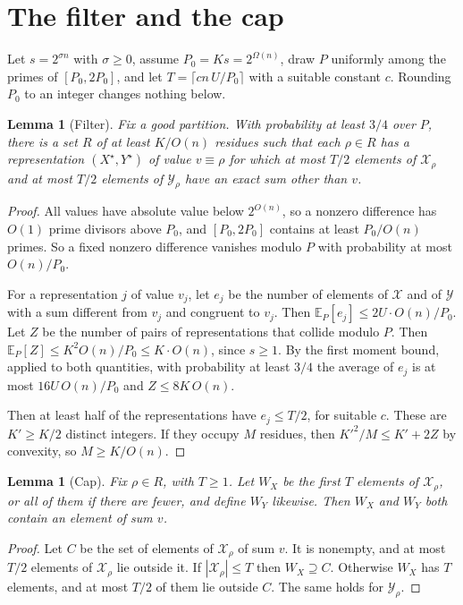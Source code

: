\documentclass[11pt]{article}
\newtheorem{lemma}[theorem]{Lemma}
\theoremstyle{remark}
\newcommand{\Xs}{\mathcal X}
\newcommand{\Ys}{\mathcal Y}
\begin{document}
\section{The filter and the cap}\label{sec:filter}

Let $s=2^{\sigma n}$ with $\sigma\ge0$, assume $P_0=Ks=2^{\Omega(n)}$, draw $P$ uniformly among the primes of $[P_0,2P_0]$, and let $T=\lceil cn\,U/P_0\rceil$ with a suitable constant $c$. Rounding $P_0$ to an integer changes nothing below.

\begin{lemma}[Filter]\label{lem:filter}
Fix a good partition. With probability at least $3/4$ over $P$, there is a set $R$ of at least $K/O(n)$ residues such that each $\rho\in R$ has a representation $(X^\star,Y^\star)$ of value $v\equiv\rho$ for which at most $T/2$ elements of $\Xs_\rho$ and at most $T/2$ elements of $\Ys_\rho$ have an exact sum other than $v$.
\end{lemma}
\begin{proof}
All values have absolute value below $2^{O(n)}$, so a nonzero difference has $O(1)$ prime divisors above $P_0$, and $[P_0,2P_0]$ contains at least $P_0/O(n)$ primes. So a fixed nonzero difference vanishes modulo $P$ with probability at most $O(n)/P_0$.

For a representation $j$ of value $v_j$, let $e_j$ be the number of elements of $\Xs$ and of $\Ys$ with a sum different from $v_j$ and congruent to $v_j$. Then $\mathbb E_P[e_j]\le2U\cdot O(n)/P_0$. Let $Z$ be the number of pairs of representations that collide modulo $P$. Then $\mathbb E_P[Z]\le K^2O(n)/P_0\le K\cdot O(n)$, since $s\ge1$. By the first moment bound, applied to both quantities, with probability at least $3/4$ the average of $e_j$ is at most $16U\,O(n)/P_0$ and $Z\le8K\,O(n)$.

Then at least half of the representations have $e_j\le T/2$, for suitable $c$. These are $K'\ge K/2$ distinct integers. If they occupy $M$ residues, then $K'^2/M\le K'+2Z$ by convexity, so $M\ge K/O(n)$.
\end{proof}

\begin{lemma}[Cap]\label{lem:cap}
Fix $\rho\in R$, with $T\ge1$. Let $W_X$ be the first $T$ elements of $\Xs_\rho$, or all of them if there are fewer, and define $W_Y$ likewise. Then $W_X$ and $W_Y$ both contain an element of sum $v$.
\end{lemma}
\begin{proof}
Let $C$ be the set of elements of $\Xs_\rho$ of sum $v$. It is nonempty, and at most $T/2$ elements of $\Xs_\rho$ lie outside it. If $|\Xs_\rho|\le T$ then $W_X\supseteq C$. Otherwise $W_X$ has $T$ elements, and at most $T/2$ of them lie outside $C$. The same holds for $\Ys_\rho$.
\end{proof}
\end{document}
